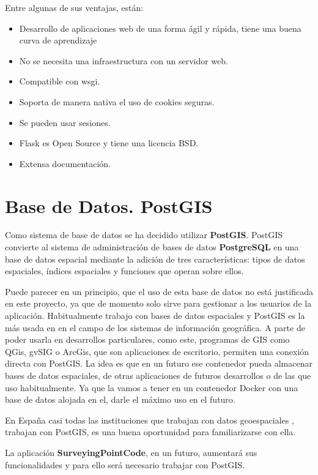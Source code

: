 Entre algunas de sus ventajas, están:
\begin{itemize}
\item Desarrollo de aplicaciones web de una forma ágil y rápida, tiene una buena curva de aprendizaje
\item No se necesita una infraestructura con un servidor web.
\item Compatible con wsgi.
\item Soporta de manera nativa el uso de cookies seguras.
\item Se pueden usar sesiones.
\item Flask es Open Source y tiene una licencia BSD.
\item Extensa documentación.
\end{itemize}

\section{Base de Datos. PostGIS}

Como sistema de base de datos se ha decidido utilizar \textbf{PostGIS}. PostGIS convierte al sistema de administración de bases de datos \textbf{PostgreSQL} en una base de datos espacial mediante la adición de tres características: tipos de datos espaciales, índices espaciales y funciones que operan sobre ellos.

Puede parecer en un principio, que el uso de esta base de datos no está justificada en este proyecto, ya que de momento solo sirve para gestionar a los usuarios de la aplicación. Habitualmente trabajo con bases de datos espaciales y PostGIS es la más usada en en el campo de los sistemas de información geográfica. A parte de poder usarla en desarrollos particulares, como este, programas de GIS como QGis, gvSIG o ArcGis, que son aplicaciones de escritorio,  permiten una conexión directa con PostGIS. 
La idea es que en un futuro ese contenedor pueda almacenar bases de datos espaciales, de otras aplicaciones de futuros desarrollos o de las que uso habitualmente. Ya que la vamos a tener en un contenedor Docker con una base de datos alojada en el, darle el máximo uso en el futuro.

En España casi todas las instituciones que trabajan con datos geoespaciales , trabajan con PostGIS, es una buena oportunidad para familiarizarse con ella.

La aplicación \textbf{SurveyingPointCode}, en un futuro, aumentará sus funcionalidades y para ello será necesario trabajar con PostGIS.

